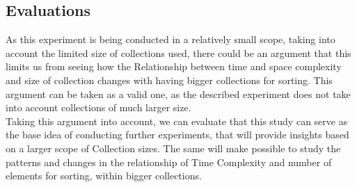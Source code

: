 \documentclass[]{report}
\begin{document}
\subsection{Evaluations}
	As this experiment is being conducted in a relatively small scope, taking into account the limited size of collections used, there could be an argument that this limits us from seeing how the Relationship between time and space complexity and size of collection changes with having bigger collections for sorting. This argument can be taken as a valid one, as the described experiment does not take into account collections of much larger size. \\
	
	Taking this argument into account, we can evaluate that this study can serve as the base idea of conducting further experiments, that will provide insights based on a larger scope of Collection sizes. The same will make possible to study the patterns and changes in the relationship of Time Complexity and number of elements for sorting, within bigger collections.
	
	
 
\end{document}
